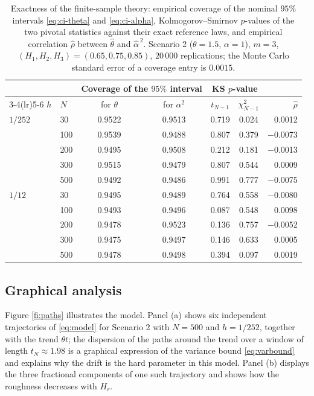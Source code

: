 \documentclass[11pt,reqno]{amsart}
\numberwithin{equation}{section}
\theoremstyle{plain}
\theoremstyle{definition}
\theoremstyle{remark}
\begin{document}
\begin{table}[htbp]
\caption{Exactness of the finite-sample theory: empirical coverage of the nominal $95\%$
intervals \eqref{eq:ci-theta} and \eqref{eq:ci-alpha}, Kolmogorov--Smirnov $p$-values of
the two pivotal statistics against their exact reference laws, and empirical correlation
$\widehat\rho$ between $\widehat\theta$ and $\widehat\alpha^{\,2}$. Scenario 2
($\theta=1.5$, $\alpha=1$), $m=3$,
$(H_1,H_2,H_3)=(0.65,0.75,0.85)$, $20\,000$ replications; the Monte Carlo standard error
of a coverage entry is $0.0015$.}
\label{ta:coverage}
\small
\begin{tabular}{@{}llccccr@{}}
\toprule
 & & \multicolumn{2}{c}{Coverage of the $95\%$ interval}
   & \multicolumn{2}{c}{KS $p$-value} & \\
\cmidrule(lr){3-4}\cmidrule(lr){5-6}
$h$ & $N$ & for $\theta$ & for $\alpha^{2}$ & $t_{N-1}$ & $\chi^{2}_{N-1}$
    & $\widehat\rho$\\
\midrule
$1/252$ & 30  & 0.9522 & 0.9513 & 0.719 & 0.024 & \phantom{$-$}0.0012\\
        & 100 & 0.9539 & 0.9488 & 0.807 & 0.379 & $-$0.0073\\
        & 200 & 0.9495 & 0.9508 & 0.212 & 0.181 & $-$0.0013\\
        & 300 & 0.9515 & 0.9479 & 0.807 & 0.544 & \phantom{$-$}0.0009\\
        & 500 & 0.9492 & 0.9486 & 0.991 & 0.777 & $-$0.0075\\
\addlinespace
$1/12$  & 30  & 0.9495 & 0.9489 & 0.764 & 0.558 & $-$0.0080\\
        & 100 & 0.9493 & 0.9496 & 0.087 & 0.548 & \phantom{$-$}0.0098\\
        & 200 & 0.9478 & 0.9523 & 0.136 & 0.757 & $-$0.0052\\
        & 300 & 0.9475 & 0.9497 & 0.146 & 0.633 & \phantom{$-$}0.0005\\
        & 500 & 0.9478 & 0.9498 & 0.394 & 0.097 & \phantom{$-$}0.0019\\
\bottomrule
\end{tabular}
\end{table}

\subsection{Graphical analysis}

Figure \ref{fi:paths} illustrates the model. Panel (a) shows six independent trajectories
of \eqref{eq:model} for Scenario 2 with $N=500$ and $h=1/252$, together with the trend
$\theta t$; the dispersion of the paths around the trend over a window of length
$t_N\approx1.98$ is a graphical expression of the variance bound \eqref{eq:varbound} and
explains why the drift is the hard parameter in this model. Panel (b) displays the three
fractional components of one such trajectory and shows how the roughness decreases with
$H_r$.
\end{document}
